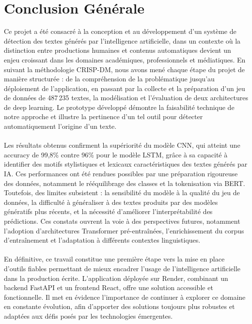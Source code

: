 \chapter*{Conclusion Générale}

Ce projet a été consacré à la conception et au développement d'un système de détection
des textes générés par l'intelligence artificielle, dans un contexte où la distinction entre
productions humaines et contenus automatiques devient un enjeu croissant dans les
domaines académiques, professionnels et médiatiques. En suivant la méthodologie
CRISP-DM, nous avons mené chaque étape du projet de manière structurée : de la
compréhension de la problématique jusqu'au déploiement de l'application, en passant
par la collecte et la préparation d'un jeu de données de 487\,235 textes, la modélisation
et l'évaluation de deux architectures de deep learning. Le prototype développé démontre
la faisabilité technique de notre approche et illustre la pertinence d'un tel outil pour
détecter automatiquement l'origine d'un texte.
\\
\\
Les résultats obtenus confirment la supériorité du modèle CNN, qui atteint une accuracy
de 99{,}8\% contre 96\% pour le modèle LSTM, grâce à sa capacité à identifier des
motifs stylistiques et lexicaux caractéristiques des textes générés par IA. Ces performances
ont été rendues possibles par une préparation rigoureuse des données, notamment le
rééquilibrage des classes et la tokenisation via BERT. Toutefois, des limites subsistent :
la sensibilité du modèle à la qualité du jeu de données, la difficulté à généraliser à des
textes produits par des modèles génératifs plus récents, et la nécessité d'améliorer
l'interprétabilité des prédictions. Ces constats ouvrent la voie à des perspectives futures,
notamment l'adoption d'architectures Transformer pré-entraînées, l'enrichissement du
corpus d'entraînement et l'adaptation à différents contextes linguistiques.
\\
\\
En définitive, ce travail constitue une première étape vers la mise en place d'outils
fiables permettant de mieux encadrer l'usage de l'intelligence artificielle dans la
production écrite. L'application déployée sur Render, combinant un backend FastAPI
et un frontend React, offre une solution accessible et fonctionnelle. Il met en évidence
l'importance de continuer à explorer ce domaine en constante évolution, afin d'apporter
des solutions toujours plus robustes et adaptées aux défis posés par les technologies
émergentes.